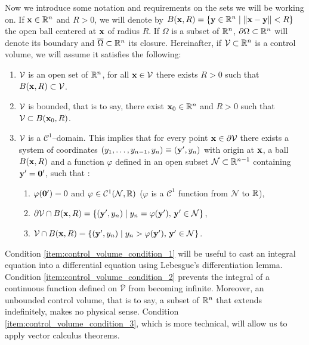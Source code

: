 Now we introduce some notation and requirements on the sets we will be working on. If $\vb{x} \in \mathbb{R}^n$ and $R > 0$, we will denote by $B(\vb{x}, R) = \{ \vb{y} \in \mathbb{R}^n \mid \norm{\vb{x} - \vb{y}} < R \}$ the open ball centered at $\vb{x}$ of radius $R$. If $\Omega$ is a subset of $\mathbb{R}^n$, $\partial \Omega \subset \mathbb{R}^n$ will denote its boundary and $\overline{\Omega} \subset \mathbb{R}^n$ its closure. Hereinafter, if $\mathcal{V}_{} \subset \mathbb{R}^n$ is a control volume, we will assume it satisfies the following:
\begin{enumerate}[label={(\roman*)}, topsep=0pt]
	\item $\mathcal{V}_{}$ is an open set of $\mathbb{R}^n$, \ie for all $\vb{x} \in \mathcal{V}_{}$ there exists $R > 0$ such that $B(\vb{x}, R) \subset \mathcal{V}_{}$. \label{item:control_volume_condition_1}
	\item $\mathcal{V}_{}$ is bounded, that is to say, there exist $\vb{x}_0 \in \mathbb{R}^n$ and $R > 0$ such that $\mathcal{V}_{} \subset B(\vb{x}_0, R)$. \label{item:control_volume_condition_2}
	\item $\mathcal{V}_{}$ is a $\mathcal{C}^1$--domain. This implies that for every point $\vb{x} \in \partial \mathcal{V}_{}$ there exists a system of coordinates $(y_1, \ldots, y_{n-1}, y_n) \equiv (\vb{y}', y_n)$ with origin at $\vb{x}$, a ball $B(\vb{x}, R)$ and a function $\varphi$ defined in an open subset $\mathcal{N} \subset \mathbb{R}^{n-1}$ containing $\vb{y}' = \vb{0}'$, such that \cite{salsa2009chap1}: \label{item:control_volume_condition_3}
	\begin{enumerate}[topsep=0pt]
		\item $\varphi(\vb{0'}) = 0$ and $\varphi \in \mathcal{C}^1(\mathcal{N}, \mathbb{R})$ ($\varphi$ is a $\mathcal{C}^1$ function from $\mathcal{N}$ to $\mathbb{R}$),
		\item $\partial \mathcal{V}_{} \cap B(\vb{x}, R) = \{ (\vb{y'}, y_n) \mid y_n = \varphi(\vb{y'}), \, \vb{y'} \in \mathcal{N} \}$,
		\item $\mathcal{V}_{} \cap B(\vb{x}, R) = \{ (\vb{y'}, y_n) \mid y_n > \varphi(\vb{y'}), \, \vb{y'} \in \mathcal{N} \}$.
	\end{enumerate} 
\end{enumerate}
Condition \ref{item:control_volume_condition_1} will be useful to cast an integral equation into a differential equation using Lebesgue's differentiation lemma. Condition \ref{item:control_volume_condition_2} prevents the integral of a continuous function defined on $\overline{\mathcal{V}}$ from becoming infinite. Moreover, an unbounded control volume, that is to say, a subset of $\mathbb{R}^n$ that extends indefinitely, makes no physical sense. Condition \ref{item:control_volume_condition_3}, which is more technical, will allow us to apply vector calculus theorems.

